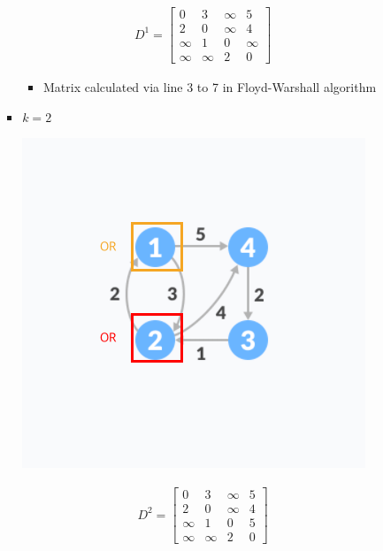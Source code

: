 \documentclass[12pt]{article}
\begin{document}
\begin{enumerate}[1.]
\begin{itemize}
\begin{itemize}
\begin{itemize}
                \begin{align}
                    D^1 = \begin{bmatrix}
                        0 & 3 & \infty & 5\\
                        2 & 0 & \infty & 4  \\
                        \infty & 1 & 0 & \infty \\
                        \infty & \infty & 2 & 0
                    \end{bmatrix}
                \end{align}

                \begin{itemize}
                    \item Matrix calculated via line 3 to 7 in Floyd-Warshall algorithm
                \end{itemize}

                \item $k = 2$

                \begin{center}
                \includegraphics[width=0.5\linewidth]{images/worksheet_4_solution_49.png}
                \end{center}

                \begin{align}
                    D^2 = \begin{bmatrix}
                        0 & 3 & \infty & 5\\
                        2 & 0 & \infty & 4\\
                        \infty & 1 & 0 & 5\\
                        \infty & \infty & 2 & 0
                    \end{bmatrix}
                \end{align}


\end{itemize}
\end{itemize}
\end{itemize}
\end{enumerate}
\end{document}
